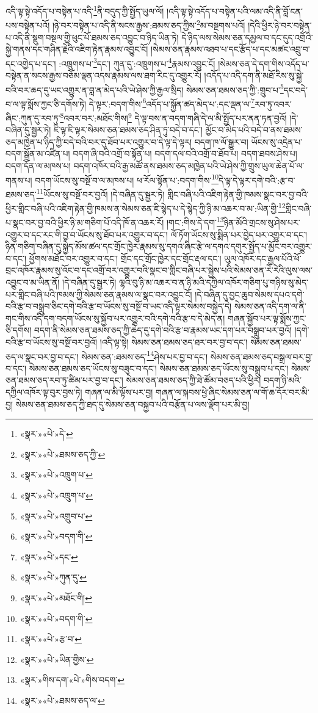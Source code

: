 འདི་ལྟ་སྟེ་འདོད་པ་བསྟེན་པ་འདི་\footnote{«སྣར་»«པེ་»དེ་}ནི་བདུད་ཀྱི་སྤྱོད་ཡུལ་ལོ། །འདི་ལྟ་སྟེ་འདོད་པ་བསྟེན་པའི་ལམ་འདི་ནི་བློ་ངན་པས་བསྟེན་པའོ། །ཉེ་བར་བསྟེན་པ་འདི་ནི་སངས་རྒྱས་:ཐམས་ཅད་ཀྱིས་\footnote{«སྣར་»«པེ་»ཐམས་ཅད་ཀྱི་}མ་བསྔགས་པའོ། །དེའི་ཕྱིར་ཉེ་བར་བསྟེན་པ་འདི་ནི་སྡུག་བསྔལ་གྱི་ཕུང་པོ་ཐམས་ཅད་འབྱུང་བ་ཉིད་ཡིན་ཏེ། དེ་ཉིད་ལས་སེམས་ཅན་དམྱལ་བ་དང་དུད་འགྲོའི་སྐྱེ་གནས་དང་གཤིན་རྗེའི་འཇིག་རྟེན་རྣམས་འབྱུང་ངོ། །སེམས་ཅན་རྣམས་འཐབ་པ་དང་རྩོད་པ་དང་མཚང་འབྲུ་བ་དང་འགྱེད་པ་དང་། :འཁྲུགས་པ་\footnote{«སྣར་»«པེ་»འཁྲུག་པ་}དང་། ཀུན་དུ་:འཁྲུགས་པ་\footnote{«སྣར་»«པེ་»འཁྲུག་པ་}རྣམས་འབྱུང་ངོ། །སེམས་ཅན་དེ་དག་གིས་འདོད་པ་བསྟེན་ན་སངས་རྒྱས་བཅོམ་ལྡན་འདས་རྣམས་ལས་ཐག་རིང་དུ་འགྱུར་རོ། །འདོད་པ་འདི་དག་ནི་མཐོ་རིས་སུ་སྐྱེ་བའི་བར་ཆད་དུ་ཡང་འགྱུར་ན་བླ་ན་མེད་པའི་ཡེ་ཤེས་ཀྱི་རྒྱལ་སྲིད། སེམས་ཅན་ཐམས་ཅད་ཀྱི་:གྲུབ་པ་\footnote{«སྣར་»«པེ་»འགྲུབ་པ་}དང་བདེ་བ་ལ་ལྟ་སྨོས་ཀྱང་ཅི་དགོས་ཏེ། དེ་ལྟར་:བདག་གིས་\footnote{«སྣར་»«པེ་»བདག་གི་}འདོད་པ་སྐྱོན་ཚད་མེད་པ་:དང་ལྡན་ལ་\footnote{«སྣར་»«པེ་»དང་}རབ་ཏུ་འབར་ཞིང་:ཀུན་དུ་རབ་ཏུ་\footnote{«སྣར་»«པེ་»ཀུན་དུ་}འབར་བར་:མཐོང་གིས།\footnote{«སྣར་»«པེ་»མཐོང་གི།} དེ་ལྟ་བས་ན་བདག་གཞི་དེ་ལ་མི་སྤྱོད་པར་ནན་ཏན་བྱའོ། །དེ་བཞིན་དུ་སྦྱར་ཏེ། ཇི་ལྟ་ཇི་ལྟར་སེམས་ཅན་ཐམས་ཅད་ཤིན་ཏུ་བདེ་བ་དང་། མྱོང་བ་མེད་པའི་བདེ་བ་ནས་ཐམས་ཅད་མཁྱེན་པ་ཉིད་ཀྱི་བདེ་བའི་བར་དུ་ཐོབ་པར་འགྱུར་བ་དེ་ལྟ་དེ་ལྟར། བདག་ཁ་ལོ་སྒྱུར་བ། ཡོངས་སུ་འདྲེན་པ་བདག་སྒྲོན་མ་འཛིན་པ། བདག་ཞི་བའི་འགྲོ་བ་སྟོན་པ། བདག་དལ་བའི་འགྲོ་བ་ཐོབ་པ། བདག་ཐབས་ཤེས་པ། བདག་དོན་ལ་མཁས་པ། བདག་འཁོར་བའི་རྒྱ་མཚོ་ནས་ཐམས་ཅད་མཁྱེན་པའི་ཡེ་ཤེས་ཀྱི་གྲུས་ཡུལ་ཆེན་པོ་ལ་གནས་པ། བདག་ཡོངས་སུ་བསྔོ་བ་ལ་མཁས་པ། ཕ་རོལ་སྟོན་པ་:བདག་གིས་\footnote{«སྣར་»«པེ་»བདག་གི་}དེ་ལྟ་དེ་ལྟར་དགེ་བའི་:རྩ་བ་ཐམས་ཅད་\footnote{«སྣར་»«པེ་»རྩ་བ་}ཡོངས་སུ་བསྔོ་བར་བྱའོ། །དེ་བཞིན་དུ་སྦྱར་ཏེ། གླིང་བཞི་པའི་འཇིག་རྟེན་གྱི་ཁམས་སྣང་བར་བྱ་བའི་ཕྱིར་གླིང་བཞི་པའི་འཇིག་རྟེན་གྱི་ཁམས་ན་སེམས་ཅན་ཇི་སྙེད་པ་དེ་སྙེད་ཀྱི་ཉི་མ་འཆར་བ་མ་:ཡིན་གྱི་\footnote{«སྣར་»«པེ་»ཡིན་གྱིས་}གླིང་བཞི་པ་སྣང་བར་བྱ་བའི་ཕྱིར་ཉི་མ་གཅིག་པོ་འདི་ཁོ་ན་འཆར་རོ། །གང་:གིས་དེ་དག་\footnote{«སྣར་»གིས་དག་«པེ་»གིས་བདག་}ཉིན་མོའི་གྲངས་སུ་ཤེས་པར་འགྱུར་བ་དང་རང་གི་བྱ་བ་ཡོངས་སུ་ཐོབ་པར་འགྱུར་བ་དང་། ལོ་ཏོག་ཡོངས་སུ་སྨིན་པར་བྱེད་པར་འགྱུར་བ་དང་། ཉིན་གཅིག་བཞིན་དུ་སྐྱེད་མོས་ཚལ་དང་གྲོང་ཁྱེར་རྣམས་སུ་དགའ་ཞིང་རྩེ་ལ་དགའ་དགུར་སྤྱོད་པ་མྱོང་བར་འགྱུར་བ་དང་། ཕྱོགས་མཐོང་བར་འགྱུར་བ་དང་། གྲོང་དང་གྲོང་ཁྱེར་དང་གྲོང་རྡལ་དང་། ཡུལ་འཁོར་དང་རྒྱལ་པོའི་ཕོ་བྲང་འཁོར་རྣམས་སུ་འོང་བ་དང་འགྲོ་བར་འགྱུར་བའི་སྣང་བ་གླིང་བཞི་པར་སྐྱེས་པའི་སེམས་ཅན་རེ་རེའི་ལུས་ལས་འབྱུང་བ་མ་ཡིན་ནོ། །དེ་བཞིན་དུ་སྦྱར་ཏེ། ལྷའི་བུ་ཉི་མ་འཆར་བ་ན་ཉི་མའི་དཀྱིལ་འཁོར་གཅིག་པུ་གཉིས་སུ་མེད་པར་གླིང་བཞི་པའི་ཁམས་ཀྱི་སེམས་ཅན་རྣམས་ལ་སྣང་བར་འབྱུང་ངོ། །དེ་བཞིན་དུ་བྱང་ཆུབ་སེམས་དཔའ་དགེ་བའི་རྩ་བ་བསྒྲུབ་ཅིང་དགེ་བའི་རྩ་བ་ཡོངས་སུ་བསྔོ་བ་ཡང་འདི་ལྟར་སེམས་བསྐྱེད་དེ། སེམས་ཅན་འདི་དག་ལ་ནི་གང་གིས་འདི་དག་བདག་ཡོངས་སུ་སྐྱོབ་པར་འགྱུར་བའི་དགེ་བའི་རྩ་བ་དེ་མེད་ན། གཞན་སྐྱོབ་པར་ལྟ་སྨོས་ཀྱང་ཅི་དགོས། བདག་ནི་སེམས་ཅན་ཐམས་ཅད་ཀྱི་ཆེད་དུ་དགེ་བའི་རྩ་བ་རྣམས་ཡང་དག་པར་བསྒྲུབ་པར་བྱའོ། །དགེ་བའི་རྩ་བ་ཡོངས་སུ་བསྔོ་བར་བྱའོ། །འདི་ལྟ་སྟེ། སེམས་ཅན་ཐམས་ཅད་ཐར་བར་བྱ་བ་དང་། སེམས་ཅན་ཐམས་ཅད་ལ་སྣང་བར་བྱ་བ་དང་། སེམས་ཅན་:ཐམས་ཅད་\footnote{«སྣར་»«པེ་»ཐམས་ཅད་ལ་}ཤེས་པར་བྱ་བ་དང་། སེམས་ཅན་ཐམས་ཅད་བསྒྲལ་བར་བྱ་བ་དང་། སེམས་ཅན་ཐམས་ཅད་ཡོངས་སུ་བཟུང་བ་དང་། སེམས་ཅན་ཐམས་ཅད་ཡོངས་སུ་བསྒྲུབ་པ་དང་། སེམས་ཅན་ཐམས་ཅད་རབ་ཏུ་ཚིམ་པར་བྱ་བ་དང་། སེམས་ཅན་ཐམས་ཅད་ཀྱི་ཐེ་ཚོམ་བཅད་པའི་ཕྱིར། བདག་ཉི་མའི་དཀྱིལ་འཁོར་ལྟ་བུར་བྱས་ཏེ། གཞན་ལ་མི་ལྟོས་པར་བྱ། གཞན་ལ་སྐབས་ཕྱེ་ཞིང་སེམས་ཅན་ལ་གོ་ཆ་དོར་བར་མི་བྱ། སེམས་ཅན་ཐམས་ཅད་ཀྱི་ཐད་དུ་སེམས་ཅན་བསྐྱབ་པའི་བརྩོན་པ་ལས་ལྡོག་པར་མི་བྱ། 